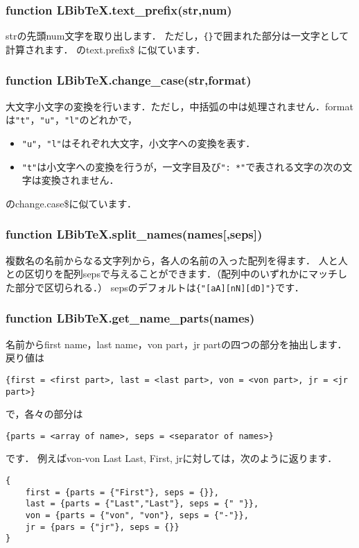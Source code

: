 \documentclass[dvipdfmx,a4paper]{jsarticle}
\begin{document}
\subsubsection{function LBibTeX.text\_prefix(str,num)}
strの先頭num文字を取り出します．
ただし，\verb|{}|で囲まれた部分は一文字として計算されます．
\BibTeX のtext.prefix\$ に似ています．

\subsubsection{function LBibTeX.change\_case(str,format)}
大文字小文字の変換を行います．ただし，中括弧の中は処理されません．formatは\verb|"t"|，\verb|"u"|，\verb|"l"|のどれかで，
\begin{itemize}
\item \verb|"u"|，\verb|"l"|はそれぞれ大文字，小文字への変換を表す．
\item \verb|"t"|は小文字への変換を行うが，一文字目及び\verb|": *"|で表される文字の次の文字は変換されません．
\end{itemize}
\BibTeX のchange.case\$に似ています．

\subsubsection{function LBibTeX.split\_names(names[,seps])}
複数名の名前からなる文字列から，各人の名前の入った配列を得ます．
人と人との区切りを配列sepsで与えることができます．（配列中のいずれかにマッチした部分で区切られる．）
sepsのデフォルトは\verb|{"[aA][nN][dD]"}|です．

\subsubsection{function LBibTeX.get\_name\_parts(names)}
名前からfirst name，last name，von part，jr partの四つの部分を抽出します．
戻り値は
\begin{lstlisting}
{first = <first part>, last = <last part>, von = <von part>, jr = <jr part>}
\end{lstlisting}
で，各々の部分は
\begin{lstlisting}
{parts = <array of name>, seps = <separator of names>}
\end{lstlisting}
です．%
例えばvon-von Last Last, First, jrに対しては，次のように返ります．
\begin{lstlisting}
{
	first = {parts = {"First"}, seps = {}},
	last = {parts = {"Last","Last"}, seps = {" "}},
	von = {parts = {"von", "von"}, seps = {"-"}},
	jr = {pars = {"jr"}, seps = {}}
}
\end{lstlisting}
\end{document}
